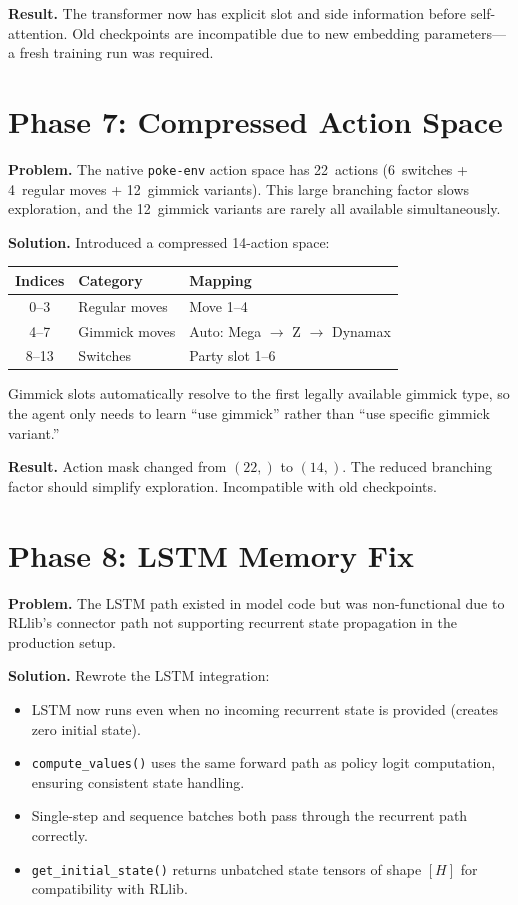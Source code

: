 \textbf{Result.} The transformer now has explicit slot and side information
before self-attention.  Old checkpoints are incompatible due to new embedding
parameters---a fresh training run was required.

\section{Phase 7: Compressed Action Space}

\textbf{Problem.} The native \texttt{poke-env} action space has 22~actions
(6~switches + 4~regular moves + 12~gimmick variants).  This large branching
factor slows exploration, and the 12~gimmick variants are rarely all available
simultaneously.

\textbf{Solution.} Introduced a compressed 14-action space:

\begin{center}
\small
\begin{tabularx}{0.7\textwidth}{c l l}
  \toprule
  \textbf{Indices} & \textbf{Category} & \textbf{Mapping} \\
  \midrule
  0--3  & Regular moves & Move 1--4 \\
  4--7  & Gimmick moves & Auto: Mega $\to$ Z $\to$ Dynamax \\
  8--13 & Switches      & Party slot 1--6 \\
  \bottomrule
\end{tabularx}
\end{center}

Gimmick slots automatically resolve to the first legally available gimmick
type, so the agent only needs to learn ``use gimmick'' rather than ``use
specific gimmick variant.''

\textbf{Result.} Action mask changed from $(22,)$ to $(14,)$.  The reduced
branching factor should simplify exploration.  Incompatible with old
checkpoints.

\section{Phase 8: LSTM Memory Fix}

\textbf{Problem.} The LSTM path existed in model code but was non-functional
due to RLlib's connector path not supporting recurrent state propagation in
the production setup.

\textbf{Solution.} Rewrote the LSTM integration:
\begin{itemize}
  \item LSTM now runs even when no incoming recurrent state is provided
        (creates zero initial state).
  \item \texttt{compute\_values()} uses the same forward path as policy logit
        computation, ensuring consistent state handling.
  \item Single-step and sequence batches both pass through the recurrent path
        correctly.
  \item \texttt{get\_initial\_state()} returns unbatched state tensors of shape
        $[H]$ for compatibility with RLlib.
\end{itemize}

